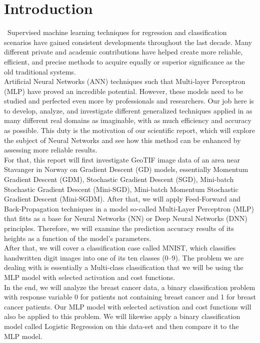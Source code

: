\section{Introduction}
\label{chap:Introduction}

\quad \, Supervised machine learning techniques for regression and classification scenarios have gained consistent developments throughout the last decade. Many different private and academic contributions have helped create more reliable, efficient, and precise methods to acquire equally or superior significance as the old traditional systems.\\

Artificial Neural Networks (ANN) techniques such that Multi-layer Perceptron (MLP) have proved an incredible potential. However, these models need to be studied and perfected even more by professionals and researchers. Our job here is to develop, analyze, and investigate different generalized techniques applied in as many different real domains as imaginable, with as much efficiency and accuracy as possible. This duty is the motivation of our scientific report, which will explore the subject of Neural Networks and see how this method can be enhanced by assessing more reliable results.\\

For that, this report will first investigate GeoTIF image data of an area near Stavanger in Norway on Gradient Descent (GD) models, essentially Momentum Gradient Descent (GDM), Stochastic Gradient Descent (SGD), Mini-batch Stochastic Gradient Descent (Mini-SGD), Mini-batch Momentum Stochastic Gradient Descent (Mini-SGDM). After that, we will apply Feed-Forward and Back-Propagation techniques in a model so-called Multi-Layer Perceptron (MLP) that fitts as a base for Neural Networks (NN) or Deep Neural Networks (DNN) principles. Therefore, we will examine the prediction accuracy results of its heights as a function of the model's parameters.\\

After that, we will cover a classification case called MNIST, which classifies handwritten digit images into one of its ten classes (0–9). The problem we are dealing with is essentially a Multi-class classification that we will be using the MLP model with selected activation and cost functions.\\

In the end, we will analyze the breast cancer data, a binary classification problem with response variable 0 for patients not containing breast cancer and 1 for breast cancer patients. Our MLP model with selected activation and cost functions will also be applied to this problem. We will likewise apply a binary classification model called Logistic Regression on this data-set and then compare it to the MLP model.\\

